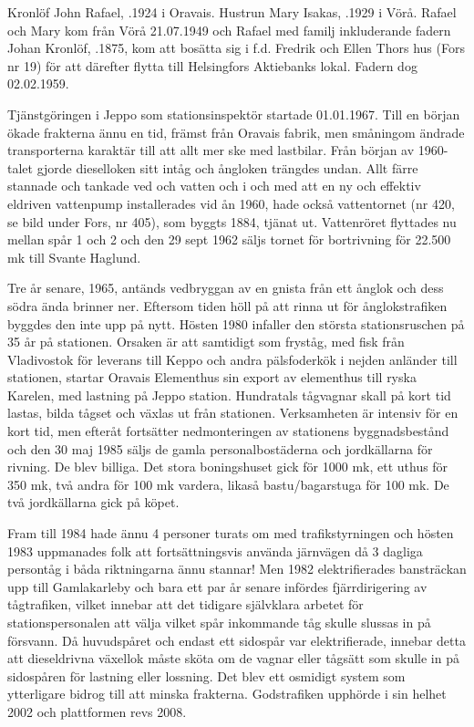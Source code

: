  Kronlöf John Rafael, .1924 i Oravais. Hustrun Mary Isakas, .1929 i Vörå. Rafael och Mary kom från Vörå 21.07.1949 och Rafael med familj inkluderande fadern Johan Kronlöf, .1875, kom att bosätta sig i f.d. Fredrik och Ellen Thors hus (Fors nr 19) för att därefter flytta till Helsingfors Aktiebanks lokal. Fadern dog 02.02.1959.

Tjänstgöringen i Jeppo som stationsinspektör startade 01.01.1967. Till en början ökade frakterna ännu en tid, främst från Oravais fabrik,  men småningom ändrade transporterna karaktär till att allt mer ske med lastbilar. Från början av 1960-talet gjorde dieselloken sitt intåg och ångloken trängdes undan. Allt färre stannade och tankade ved och vatten och i och med att en ny och effektiv eldriven vattenpump installerades vid ån 1960, hade också vattentornet (nr 420, se bild under Fors, nr 405), som byggts 1884, tjänat ut. Vattenröret flyttades nu mellan spår 1 och 2 och den 29 sept 1962 säljs tornet för bortrivning för 22.500 mk till Svante Haglund.


Tre år senare, 1965, antänds vedbryggan av en gnista från ett ånglok och dess södra ända brinner ner. Eftersom tiden höll på att rinna ut för ånglokstrafiken byggdes den inte upp på nytt. Hösten 1980 infaller den största stationsruschen på 35 år på stationen. Orsaken är att samtidigt som fryståg, med fisk från Vladivostok för leverans till  Keppo  och andra pälsfoderkök i nejden anländer till stationen, startar  Oravais Elementhus sin export av elementhus till ryska Karelen, med lastning på Jeppo station. Hundratals tågvagnar skall på kort tid lastas, bilda tågset och växlas ut från stationen. Verksamheten är intensiv för en kort tid, men efteråt fortsätter nedmonteringen av stationens byggnadsbestånd och den 30 maj 1985 säljs de gamla personalbostäderna och jordkällarna för rivning. De blev billiga. Det stora boningshuset gick för 1000 mk, ett uthus för 350 mk, två  andra för 100 mk vardera, likaså bastu/bagarstuga för 100 mk. De två jordkällarna gick på köpet.

Fram till 1984 hade ännu 4 personer turats om med trafikstyrningen och hösten 1983 uppmanades folk att fortsättningsvis använda järnvägen då 3 dagliga persontåg i båda riktningarna ännu stannar! Men 1982 elektrifierades bansträckan upp till Gamlakarleby och bara ett par år senare infördes fjärrdirigering av tågtrafiken, vilket innebar att det tidigare självklara arbetet för stationspersonalen att välja vilket spår inkommande tåg skulle slussas in på försvann. Då huvudspåret och endast ett sidospår var elektrifierade, innebar detta att dieseldrivna växellok måste sköta om de vagnar eller tågsätt som skulle in på sidospåren för lastning eller lossning. Det blev ett osmidigt system som ytterligare bidrog till att minska frakterna. Godstrafiken upphörde i sin helhet 2002 och plattformen revs 2008.

